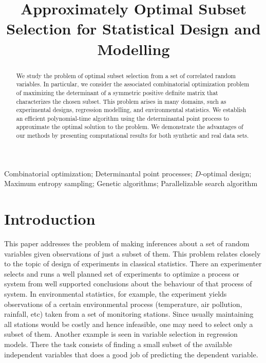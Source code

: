 \documentclass[]{interact}
\theoremstyle{plain}%
\theoremstyle{definition}
\theoremstyle{remark}
\begin{document}

\title{Approximately Optimal Subset Selection for Statistical Design and Modelling}


\author{
}

\maketitle

\begin{abstract}
We study the problem of optimal subset selection from a set of correlated random variables. In particular, we consider the associated combinatorial optimization problem of maximizing the determinant of a symmetric positive definite matrix that characterizes the chosen subset. This problem arises in many domains, such as experimental designs, regression modelling, and environmental statistics. We establish an efficient polynomial-time algorithm using the determinantal point process to approximate the optimal solution to the problem. We demonstrate the advantages of our methods by presenting computational results for both synthetic and real data sets. 
\end{abstract}

\begin{keywords}
Combinatorial optimization; Determinantal point processes; $D$-optimal design; Maximum entropy sampling; Genetic algorithms; Parallelizable search algorithm
\end{keywords}


\section{Introduction}\label{intro}	

This paper addresses the problem of making inferences about a set of random variables given observations of just a subset of them. This problem relates closely to the topic of design of experiments in classical statistics.  There an experimenter selects and runs a well planned set of experiments to optimize a process or system from well supported conclusions about the  behaviour of that process of system. In environmental statistics, for example, the experiment yields observations of a certain environmental process (temperature, air pollution, rainfall, etc) taken from a set of monitoring stations. Since usually maintaining all stations would be costly and hence infeasible, one may need to select only a subset of them. Another example is seen in variable selection in regression models.  There the task consists of finding a small subset of the available independent variables that does a good job of predicting the dependent variable. 
\end{document}
